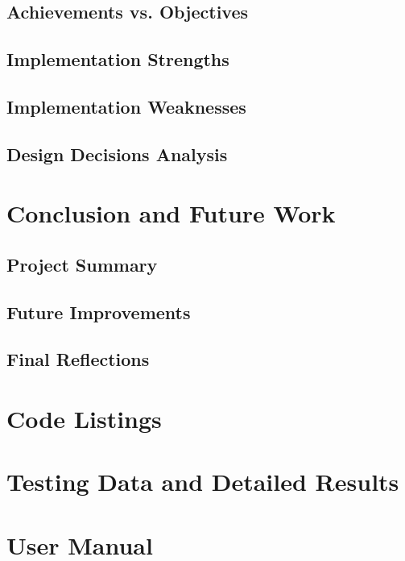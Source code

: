\documentclass[12pt,a4paper]{report}
\begin{document}
\section{Achievements vs. Objectives}

\section{Implementation Strengths}

\section{Implementation Weaknesses}

\section{Design Decisions Analysis}

\chapter{Conclusion and Future Work}
\section{Project Summary}

\section{Future Improvements}

\section{Final Reflections}

\appendix
\chapter{Code Listings}

\chapter{Testing Data and Detailed Results}

\chapter{User Manual}

\renewcommand\bibname{References}
\begin{raggedright} %
	
	
\end{raggedright}
\end{document}
